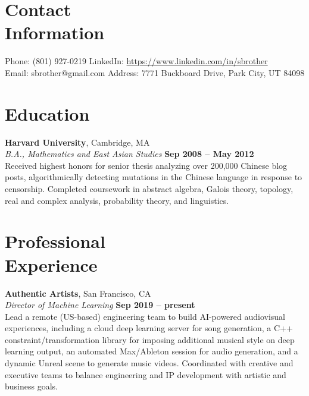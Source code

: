 \documentclass[margin,line]{resume}
\begin{document}
\begin{resume}
    \section{\mysidestyle Contact\\Information}

    Phone: (801) 927-0219       \hfill LinkedIn: \url{https://www.linkedin.com/in/sbrother} \\
    \noindent Email: sbrother@gmail.com  \hfill Address: 7771 Buckboard Drive, Park City, UT 84098 \vspace{0mm}\\\vspace{-4.5mm}

    \section{\mysidestyle Education}

    \textbf{Harvard University}, Cambridge, MA \vspace{2mm}\\\vspace{1mm}%
    \textsl{B.A., Mathematics and East Asian Studies} \hfill \textbf{Sep 2008 -- May 2012}\\
    Received highest honors for senior thesis analyzing over 200,000 Chinese
    blog posts, algorithmically detecting mutations in the Chinese language in
    response to censorship. Completed coursework in abstract algebra,
    Galois theory, topology, real and complex analysis, probability theory, and
    linguistics.

    \section{\mysidestyle Professional\\Experience}

    \textbf{Authentic Artists}, San Francisco, CA \vspace{2mm}\\\vspace{1mm}%
    \textsl{Director of Machine Learning} \hfill \textbf{Sep 2019 -- present}\\
    Lead a remote (US-based) engineering team to build AI-powered audiovisual
    experiences, including a cloud deep learning server for song generation, a
    C++ constraint/transformation library for imposing additional musical style
    on deep learning output, an automated Max/Ableton session for audio
    generation, and a dynamic Unreal scene to generate music videos. Coordinated
    with creative and executive teams to balance engineering and IP development
    with artistic and business goals.


\end{resume}
\end{document}
